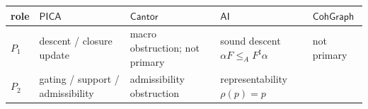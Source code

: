 \documentclass[11pt]{article}
\theoremstyle{definition}
\begin{document}
\begin{longtable}[]{@{}lllll@{}}
\toprule
\begin{minipage}[b]{0.05\columnwidth}\raggedright
role\strut
\end{minipage} & \begin{minipage}[b]{0.18\columnwidth}\raggedright
\(\mathsf{PICA}\)\strut
\end{minipage} & \begin{minipage}[b]{0.20\columnwidth}\raggedright
\(\mathsf{Cantor}\)\strut
\end{minipage} & \begin{minipage}[b]{0.25\columnwidth}\raggedright
\(\mathsf{AI}\)\strut
\end{minipage} & \begin{minipage}[b]{0.19\columnwidth}\raggedright
\(\mathsf{CohGraph}\)\strut
\end{minipage}\tabularnewline
\midrule
\endhead
\begin{minipage}[t]{0.05\columnwidth}\raggedright
\(P_{1}\)\strut
\end{minipage} & \begin{minipage}[t]{0.18\columnwidth}\raggedright
descent / closure update\strut
\end{minipage} & \begin{minipage}[t]{0.20\columnwidth}\raggedright
macro obstruction; not primary\strut
\end{minipage} & \begin{minipage}[t]{0.25\columnwidth}\raggedright
sound descent \(\alpha F\le_{A}F^{\sharp}\alpha\)\strut
\end{minipage} & \begin{minipage}[t]{0.19\columnwidth}\raggedright
not primary\strut
\end{minipage}\tabularnewline
\begin{minipage}[t]{0.05\columnwidth}\raggedright
\(P_{2}\)\strut
\end{minipage} & \begin{minipage}[t]{0.18\columnwidth}\raggedright
gating / support / admissibility\strut
\end{minipage} & \begin{minipage}[t]{0.20\columnwidth}\raggedright
admissibility obstruction\strut
\end{minipage} & \begin{minipage}[t]{0.25\columnwidth}\raggedright
representability \(\rho(p)=p\)\strut
\end{minipage} & \begin{minipage}[t]{0.19\columnwidth}\raggedright

\end{minipage}
\end{longtable}
\end{document}
